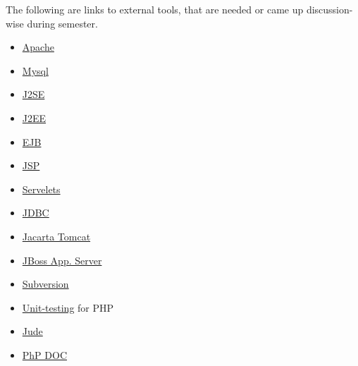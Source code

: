 The following are links to external tools, that are needed or came up
discussion-wise during semester.


\begin{itemize}
\item \href{http://www.apache.org}{Apache}
\item \href{http://www.mysql.org}{Mysql}
\item \href{http://java.sun.com/j2se/index.jsp}{J2SE}
\item \href{http://java.sun.com/j2ee/index.jsp}{J2EE}
\item \href{http://java.sun.com/products/ejb/}{EJB}
\item \href{http://java.sun.com/products/jsp/index.jsp}{JSP}
\item \href{http://java.sun.com/products/servlet/index.jsp}{Servelets}
\item \href{http://www.mysql.com/products/connector/j/}{JDBC}
\item \href{http://jakarta.apache.org/tomcat/index.html}{Jacarta Tomcat}
\item \href{http://www.jboss.org/}{JBoss App. Server}
\item \href{ttp://subversion.tigris.org/}{Subversion}
\item \href{http://www.sebastian-bergmann.de/en/phpunit.php}{Unit-testing} for PHP
\item \href{https://www.esm.jp/jude-web/en/index.html}{Jude}
\item \href{http://www.phpdoc.org/docs/HTMLSmartyConverter/default/phpDocumentor/tutorial_tags.pkg.html}{PhP DOC}
\end{itemize}






